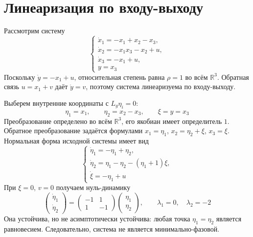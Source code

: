 
\setlength{\abovedisplayskip}{7pt}
\setlength{\belowdisplayskip}{7pt}
\setlength{\abovedisplayshortskip}{4pt}
\setlength{\belowdisplayshortskip}{4pt}

\tableofcontents
\newpage

\section{Линеаризация по входу-выходу}

Рассмотрим систему
\begin{equation}
  \begin{cases}
    \dot x_1=-x_1+x_2-x_3,\\
    \dot x_2=-x_1x_3-x_2+u,\\
    \dot x_3=-x_1+u,\\
    y=x_3
  \end{cases}
\end{equation}
Поскольку $\dot y=-x_1+u$, относительная степень равна $\rho=1$
во всём $\mathbb R^3$. Обратная связь $u=x_1+v$ даёт $\dot y=v$,
поэтому система линеаризуема по входу-выходу.

Выберем внутренние координаты с $L_g\eta_i=0$:
\begin{equation}
  \eta_1=x_1,\qquad \eta_2=x_2-x_3,\qquad \xi=y=x_3
\end{equation}
Преобразование определено во всём $\mathbb R^3$, его якобиан имеет
определитель $1$. Обратное преобразование задаётся формулами
$x_1=\eta_1$, $x_2=\eta_2+\xi$, $x_3=\xi$.
Нормальная форма исходной системы имеет вид
\begin{equation}
  \begin{cases}
    \dot\eta_1=-\eta_1+\eta_2,\\
    \dot\eta_2=\eta_1-\eta_2-(\eta_1+1)\xi,\\
    \dot \xi=-\eta_1+u
  \end{cases}
\end{equation}
При $\xi=0$, $v=0$ получаем нуль-динамику
\begin{equation}
  \begin{pmatrix}\dot\eta_1\\\dot\eta_2\end{pmatrix}
  =\begin{pmatrix}-1&1\\1&-1\end{pmatrix}
   \begin{pmatrix}\eta_1\\\eta_2\end{pmatrix},
  \qquad \lambda_1=0,\quad \lambda_2=-2
\end{equation}
Она устойчива, но не асимптотически устойчива: любая точка
$\eta_1=\eta_2$ является равновесием. Следовательно, система
не является минимально-фазовой.

